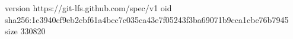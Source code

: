 version https://git-lfs.github.com/spec/v1
oid sha256:1c3940cf9eb2cbf61a4bcc7c035ca43e7f05243f3ba69071b9cca1cbe76b7945
size 330820
